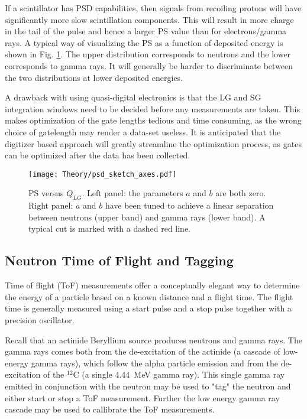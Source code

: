\documentclass[main.tex]{subfiles}
\begin{document}
If a scintillator has PSD capabilities, then signals from recoiling protons will have significantly more slow scintillation components. This will result in more charge in the tail of the pulse and hence a larger PS value than for electrons/gamma rays. A typical way of visualizing the PS as a function of deposited energy is shown in Fig. \ref{fig:psd_sketch}. The upper distribution corresponds to neutrons and the lower corresponds to gamma rays. It will generally be harder to discriminate between the two distributions at lower deposited energies.

A drawback with using quasi-digital electronics is that the LG and SG integration windows need to be decided before any measurements are taken. This makes optimization of the gate lengths tedious and time consuming, as the wrong choice of gatelength may render a data-set useless. It is anticipated that the digitizer based approach will greatly streamline the optimization process, as gates can be optimized after the data has been collected.
\begin{figure}[ht]
    \centering
        \texttt{[image: Theory/psd\_sketch\_axes.pdf]}
        \caption[PS versus $Q_{LG}$]{PS versus $Q_{LG}$. Left panel: the parameters $a$ and $b$ are both zero. Right panel: $a$ and $b$ have been tuned to achieve a linear separation between neutrons (upper band) and gamma rays (lower band). A typical cut is marked with a dashed red line.}
    \label{fig:psd_sketch} 
\end{figure}


\subsection{Neutron Time of Flight and Tagging}\label{sec:tof}
Time of flight (ToF) measurements offer a conceptually elegant way to determine the energy of a particle based on a known distance and a flight time. The flight time is generally measured using a start pulse and a stop pulse together with a precision oscillator.

Recall that an actinide Beryllium source produces neutrons and gamma rays. The gamma rays comes both from the de-excitation of the actinide (a cascade of low-energy gamma rays), which follow the alpha particle emission and from the de-excitation of the $^\textrm{12}$C (a single \SI{4.44}{\MeV} gamma ray). This single gamma ray emitted in conjunction with the neutron may be used to "tag" the neutron and either start or stop a ToF measurement. Further the low energy gamma ray cascade may be used to callibrate the ToF measurements.
\end{document}
